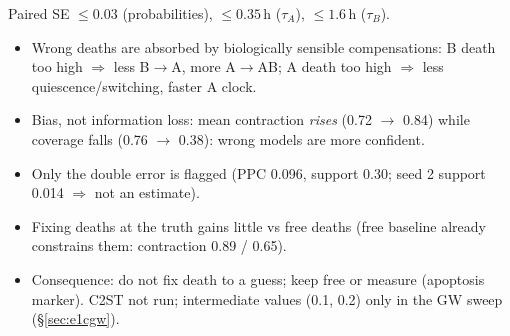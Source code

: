 \documentclass[10pt,a4paper]{article}
\newcommand{\tA}{$\tau_A$}
\newcommand{\tB}{$\tau_B$}
\newcommand{\blk}[1]{\par\needspace{5\baselineskip}\smallskip{\sffamily\bfseries\color{inkgray}#1}\par}
\newcommand{\Comment}{\blk{Comment}}
\begin{document}
Paired SE $\le 0.03$ (probabilities), $\le 0.35$\,h (\tA), $\le 1.6$\,h (\tB).
\Comment
\begin{itemize}
\item Wrong deaths are absorbed by biologically sensible compensations: B death too high $\Rightarrow$ less B$\to$A, more A$\to$AB; A death too high $\Rightarrow$ less quiescence/switching, faster A clock.
\item Bias, not information loss: mean contraction \emph{rises} (0.72 $\to$ 0.84) while coverage falls (0.76 $\to$ 0.38): wrong models are more confident.
\item Only the double error is flagged (PPC 0.096, support 0.30; seed 2 support 0.014 $\Rightarrow$ not an estimate).
\item Fixing deaths at the truth gains little vs free deaths (free baseline already constrains them: contraction 0.89 / 0.65).
\item Consequence: do not fix death to a guess; keep free or measure (apoptosis marker). C2ST not run; intermediate values (0.1, 0.2) only in the GW sweep (\S\ref{sec:e1cgw}).
\end{itemize}

\end{document}
